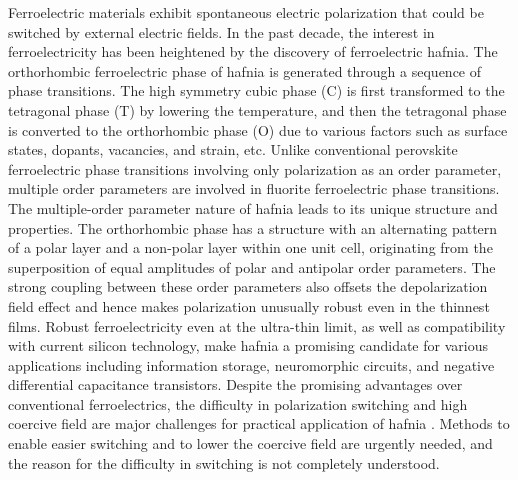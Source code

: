 \documentclass[12pt]{article}
\begin{document}
Ferroelectric materials exhibit spontaneous electric polarization that could be switched by external electric fields.
In the past decade, the interest in ferroelectricity has been heightened by the discovery of ferroelectric hafnia\cite{boscke11p112904,muller11p112901}.
The orthorhombic ferroelectric phase of hafnia is generated through a sequence of phase transitions. The high symmetry cubic phase (C) is first transformed to the tetragonal phase (T) by lowering the temperature\cite{terki08p1484}, and then the tetragonal phase is converted to the orthorhombic phase (O) due to various factors such as surface states, dopants, vacancies, and strain, etc\cite{kelley23p1144,zhou22peadd5953,mittmann19p1900042,materlik18p164101,pevsic16p4601,xu21p826,olsenp12p082905,hyuk14p072901,hoffmann15p072006,shimizu15p112904,ihlefeld23p082901}.  
Unlike conventional perovskite ferroelectric phase transitions involving only polarization as an order parameter, multiple order parameters are involved in fluorite ferroelectric phase transitions\cite{reyes14p140103,qi20p214108}. 
The multiple-order parameter nature of hafnia leads to its unique structure and properties. 
The orthorhombic phase has a structure with an alternating pattern of a polar layer and a non-polar layer within one unit cell, originating from the superposition of equal amplitudes of polar and antipolar order parameters\cite{lee20p1343}.
The strong coupling between these order parameters also offsets the depolarization field effect and hence makes polarization unusually robust even in the thinnest films\cite{zhou22peadd5953}.
Robust ferroelectricity even at the ultra-thin limit, as well as  compatibility with current silicon technology\cite{muller12p4318,boscke11p102903,mikolajick18p340}, make hafnia a promising candidate for various applications including information storage, neuromorphic circuits, and negative differential capacitance transistors\cite{mikolajick18p340, khan15p182, saha21p133701}.
Despite the promising advantages over conventional ferroelectrics, the difficulty in polarization switching and high coercive field are major challenges for practical application of hafnia \cite{zhou15p240,lee19p8929,muller15pN30,wang21p010902}. 
Methods to enable easier switching and to lower the coercive field are urgently needed, and the reason for the difficulty in switching is not completely understood.
\end{document}
